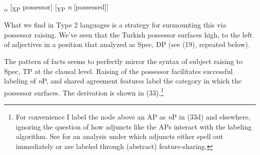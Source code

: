 \documentclass[output=paper
,modfonts
,nonflat]{langsci/langscibook}
\begin{document}
\begin{exe}
\ex *{\lbrack}\textsubscript{$\alpha$} [\textsubscript{XP} possessor] [\textsubscript{YP} \textit{n} [possessed]]{\rbrack}
\end{exe}
What we find in Type 2 languages is a strategy for surmounting this via possessor raising. We’ve seen that the Turkish possessor surfaces high, to the left of adjectives in a position that \citet{Abney1987} analyzed as Spec, DP (see (19), repeated below).

\begin{figure}[!h]
	\begin{exe}
	\end{exe}
\end{figure}
\newpage \noindent
The pattern of facts seems to perfectly mirror the syntax of subject raising to Spec, TP at the clausal level. Raising of the possessor facilitates successful labeling of \textit{n}P, and shared agreement features label the category in which the possessor surfaces. The derivation is shown in (33).\footnote{For convenience I label the node above an AP as \textit{n}P in (33d) and elsewhere, ignoring the question of how adjuncts like the APs interact with the labeling algorithm. See \citet{Oseki2014} for an analysis under which adjuncts either spell out immediately or are labeled through (abstract) feature-sharing.}
\end{document}
